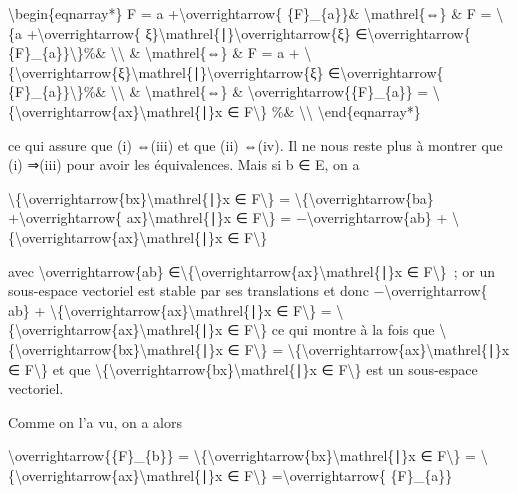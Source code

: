 \documentclass[]{article}
\begin{document}
\textbackslash{}begin\{eqnarray*\} F = a
+\textbackslash{}overrightarrow\{ \{F\}\_\{a\}\}\&
\textbackslash{}mathrel\{⇔\} \& F = \textbackslash{}\{a
+\textbackslash{}overrightarrow\{
ξ\}\textbackslash{}mathrel\{∣\}\textbackslash{}overrightarrow\{ξ\}
∈\textbackslash{}overrightarrow\{ \{F\}\_\{a\}\}\textbackslash{}\}\%\&
\textbackslash{}\textbackslash{} \& \textbackslash{}mathrel\{⇔\} \& F =
a +
\textbackslash{}\{\textbackslash{}overrightarrow\{ξ\}\textbackslash{}mathrel\{∣\}\textbackslash{}overrightarrow\{ξ\}
∈\textbackslash{}overrightarrow\{ \{F\}\_\{a\}\}\textbackslash{}\}\%\&
\textbackslash{}\textbackslash{} \& \textbackslash{}mathrel\{⇔\} \&
\textbackslash{}overrightarrow\{\{F\}\_\{a\}\} =
\textbackslash{}\{\textbackslash{}overrightarrow\{ax\}\textbackslash{}mathrel\{∣\}x
∈ F\textbackslash{}\} \%\& \textbackslash{}\textbackslash{}
\textbackslash{}end\{eqnarray*\}

ce qui assure que (i) ⇔(iii) et que (ii) ⇔(iv). Il ne nous reste plus à
montrer que (i) ⇒(iii) pour avoir les équivalences. Mais si b ∈ E, on a

\textbackslash{}\{\textbackslash{}overrightarrow\{bx\}\textbackslash{}mathrel\{∣\}x
∈ F\textbackslash{}\} =
\textbackslash{}\{\textbackslash{}overrightarrow\{ba\}
+\textbackslash{}overrightarrow\{ ax\}\textbackslash{}mathrel\{∣\}x ∈
F\textbackslash{}\} = −\textbackslash{}overrightarrow\{ab\} +
\textbackslash{}\{\textbackslash{}overrightarrow\{ax\}\textbackslash{}mathrel\{∣\}x
∈ F\textbackslash{}\}

avec \textbackslash{}overrightarrow\{ab\}
∈\textbackslash{}\{\textbackslash{}overrightarrow\{ax\}\textbackslash{}mathrel\{∣\}x
∈ F\textbackslash{}\}~; or un sous-espace vectoriel est stable par ses
translations et donc −\textbackslash{}overrightarrow\{ ab\} +
\textbackslash{}\{\textbackslash{}overrightarrow\{ax\}\textbackslash{}mathrel\{∣\}x
∈ F\textbackslash{}\} =
\textbackslash{}\{\textbackslash{}overrightarrow\{ax\}\textbackslash{}mathrel\{∣\}x
∈ F\textbackslash{}\} ce qui montre à la fois que
\textbackslash{}\{\textbackslash{}overrightarrow\{bx\}\textbackslash{}mathrel\{∣\}x
∈ F\textbackslash{}\} =
\textbackslash{}\{\textbackslash{}overrightarrow\{ax\}\textbackslash{}mathrel\{∣\}x
∈ F\textbackslash{}\} et que
\textbackslash{}\{\textbackslash{}overrightarrow\{bx\}\textbackslash{}mathrel\{∣\}x
∈ F\textbackslash{}\} est un sous-espace vectoriel.

Comme on l'a vu, on a alors

\textbackslash{}overrightarrow\{\{F\}\_\{b\}\} =
\textbackslash{}\{\textbackslash{}overrightarrow\{bx\}\textbackslash{}mathrel\{∣\}x
∈ F\textbackslash{}\} =
\textbackslash{}\{\textbackslash{}overrightarrow\{ax\}\textbackslash{}mathrel\{∣\}x
∈ F\textbackslash{}\} =\textbackslash{}overrightarrow\{ \{F\}\_\{a\}\}
\end{document}
